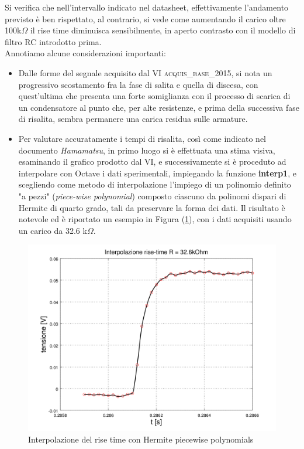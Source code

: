\documentclass[journal, a4paper]{IEEEtran}
\begin{document}
Si verifica che nell'intervallo indicato nel datasheet, effettivamente l'andamento previsto è ben rispettato, al contrario, si vede come aumentando il carico oltre 100k$\Omega$ il rise time diminuisca sensibilmente, in aperto contrasto con il modello di filtro RC introdotto prima.\\

Annotiamo alcune considerazioni importanti:

\begin{itemize}
\item Dalle forme del segnale acquisito dal VI \textsc{acquis\_base\_2015}, si nota un progressivo scostamento fra la fase di salita e quella di discesa, con quest'ultima che presenta una forte somiglianza con il processo di scarica di un condensatore al punto che, per alte resistenze, e prima della successiva fase di risalita, sembra permanere una carica residua sulle armature. 

\item Per valutare accuratamente i tempi di risalita, così come indicato nel documento \textit{Hamamatsu}, in primo luogo si è effettuata una stima visiva, esaminando il grafico prodotto dal VI, e successivamente si è proceduto ad interpolare con Octave i dati sperimentali, impiegando la funzione \textbf{interp1}, e scegliendo come metodo di interpolazione l'impiego di un polinomio definito "a pezzi" (\textit{piece-wise polynomial}) composto ciascuno da polinomi dispari di Hermite di quarto grado, tali da preservare la forma dei dati. Il risultato è notevole ed è riportato un esempio in Figura (\ref{fig:es14_10vpp_33k_hermite}), con i dati acquisiti usando un carico da 32.6 k$\Omega$.
\end{itemize}

\begin{figure}
\centering
\includegraphics[width=0.8\linewidth]{./es14_10vpp_33k_hermite}
\caption{Interpolazione del rise time con Hermite piecewise polynomials}
\label{fig:es14_10vpp_33k_hermite}
\end{figure}
\end{document}
